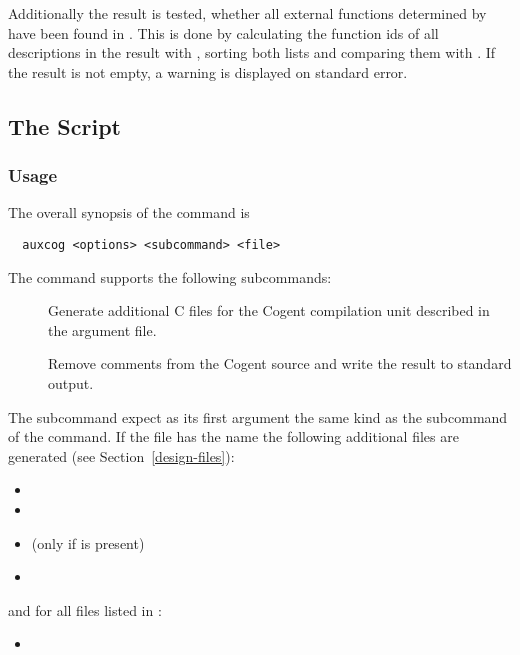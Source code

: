 Additionally the result is tested, whether all external functions determined by  have been found in 
. This is done by calculating the function ids of all descriptions in the result with , 
sorting both lists and comparing them with . If the result is not empty, a warning is displayed on standard error.

\subsection{The  Script}
\label{impl-all-auxcog}

\subsubsection{Usage}

The overall synopsis of the  command is
\begin{verbatim}
  auxcog <options> <subcommand> <file>
\end{verbatim}

The  command supports the following subcommands:
\begin{description}
\item[] Generate additional C files for the Cogent compilation unit described in the argument file.

\item[] Remove comments from the Cogent source  and write the result to standard output.

\end{description}

The subcommand  expect as its first argument  the same kind as the subcommand  
of the  command. If the file has the name  the following additional files are generated 
(see Section~\ref{design-files}):
\begin{itemize}
\item {}
\item {}
\item {} (only if  is present)
\item {}
\end{itemize}
and for all files  listed in :
\begin{itemize}
\item {}
\end{itemize}

